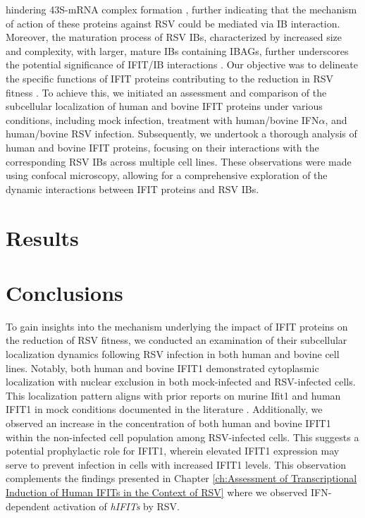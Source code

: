 hindering 43S-mRNA complex formation \cite{Diamond2014IFIT1:Translation, Guo2000CharacterizationVirus}, further indicating that the mechanism of action of these proteins against RSV could be mediated via IB interaction. Moreover, the maturation process of RSV IBs, characterized by increased size and complexity, with larger, mature IBs containing IBAGs, further underscores the potential significance of IFIT/IB interactions \cite{Rincheval2017FunctionalVirus, Jobe2021BovineResponses}. Our objective was to delineate the specific functions of IFIT proteins contributing to the reduction in RSV fitness \cite{Drori2020InfluenzaProteins}. To achieve this, we initiated an assessment and comparison of the subcellular localization of human and bovine IFIT proteins under various conditions, including mock infection, treatment with human/bovine IFN\(\alpha\), and human/bovine RSV infection. Subsequently, we undertook a thorough analysis of human and bovine IFIT proteins, focusing on their interactions with the corresponding RSV IBs across multiple cell lines. These observations were made using confocal microscopy, allowing for a comprehensive exploration of the dynamic interactions between IFIT proteins and RSV IBs.

\section{Results} \label{sec:Results-Chapter3}



\section{Conclusions} \label{sec:Conclusions-Chapter3}
To gain insights into the mechanism underlying the impact of IFIT proteins on the reduction of RSV fitness, we conducted an examination of their subcellular localization dynamics following RSV infection in both human and bovine cell lines. Notably, both human and bovine IFIT1 demonstrated cytoplasmic localization with nuclear exclusion in both mock-infected and RSV-infected cells. This localization pattern aligns with prior reports on murine Ifit1 and human IFIT1 in mock conditions documented in the literature \cite{Pichlmair2011IFIT1RNA, Terenzi2008Interferon-inducibleE1, Thul2017AProteome}. Additionally, we observed an increase in the concentration of both human and bovine IFIT1 within the non-infected cell population among RSV-infected cells. This suggests a potential prophylactic role for IFIT1, wherein elevated IFIT1 expression may serve to prevent infection in cells with increased IFIT1 levels. This observation complements the findings presented in Chapter \ref{ch:Assessment of Transcriptional Induction of Human IFITs in the Context of RSV} where we observed IFN-dependent activation of \textit{hIFITs} by RSV.

